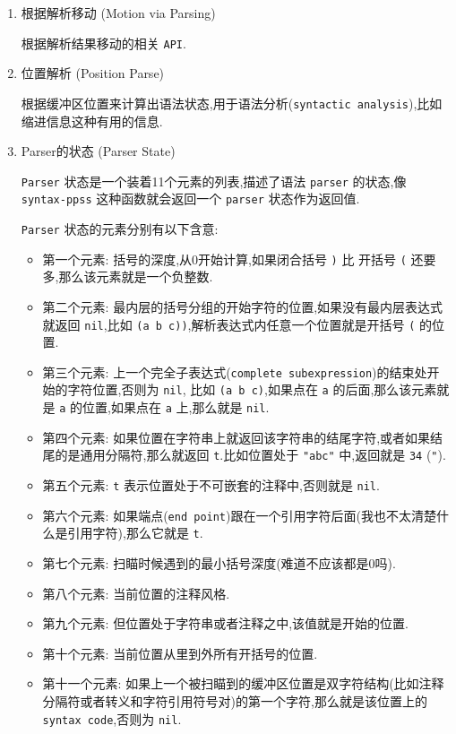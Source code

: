\documentclass[11pt]{article}
\begin{document}
\begin{enumerate}
\item 根据解析移动 (Motion via Parsing)
\label{sec:orgbfc08f5}

根据解析结果移动的相关 \texttt{API}.


\item 位置解析 (Position Parse)
\label{sec:org7db9956}

根据缓冲区位置来计算出语法状态,用于语法分析(\texttt{syntactic analysis}),比如缩进信息这种有用的信息.


\item Parser的状态 (Parser State)
\label{sec:org0b4e3a4}

\texttt{Parser} 状态是一个装着11个元素的列表,描述了语法 \texttt{parser} 的状态,像 \texttt{syntax-ppss} 这种函数就会返回一个 \texttt{parser} 状态作为返回值.

\texttt{Parser} 状态的元素分别有以下含意:

\begin{itemize}
\item 第一个元素: 括号的深度,从0开始计算,如果闭合括号 \texttt{)} 比 开括号 \texttt{(} 还要多,那么该元素就是一个负整数.
\item 第二个元素: 最内层的括号分组的开始字符的位置,如果没有最内层表达式就返回 \texttt{nil},比如 \texttt{(a b c))},解析表达式内任意一个位置就是开括号 \texttt{(} 的位置.
\item 第三个元素: 上一个完全子表达式(\texttt{complete subexpression})的结束处开始的字符位置,否则为 \texttt{nil}, 比如 \texttt{(a b c)},如果点在 \texttt{a} 的后面,那么该元素就是 \texttt{a} 的位置,如果点在 \texttt{a} 上,那么就是 \texttt{nil}.
\item 第四个元素: 如果位置在字符串上就返回该字符串的结尾字符,或者如果结尾的是通用分隔符,那么就返回 \texttt{t}.比如位置处于 \texttt{"abc"} 中,返回就是 \texttt{34} (\texttt{"}).
\item 第五个元素: \texttt{t} 表示位置处于不可嵌套的注释中,否则就是 \texttt{nil}.
\item 第六个元素: 如果端点(\texttt{end point})跟在一个引用字符后面(我也不太清楚什么是引用字符),那么它就是 \texttt{t}.
\item 第七个元素: 扫瞄时候遇到的最小括号深度(难道不应该都是0吗).
\item 第八个元素: 当前位置的注释风格.
\item 第九个元素: 但位置处于字符串或者注释之中,该值就是开始的位置.
\item 第十个元素: 当前位置从里到外所有开括号的位置.
\item 第十一个元素: 如果上一个被扫瞄到的缓冲区位置是双字符结构(比如注释分隔符或者转义和字符引用符号对)的第一个字符,那么就是该位置上的 \texttt{syntax code},否则为 \texttt{nil}.
\end{itemize}



\end{enumerate}
\end{document}
